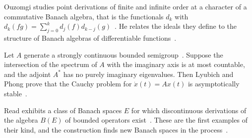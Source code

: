 Ouzomgi studies point derivations of finite and infinite order at a character
of a commutative Banach algebra, that is the functionals $d_k$ with
$d_k(fg)=\sum_{j=0}^{k}d_j(f)d_{k-j}(g)$~\cite{WlPointDerivationsAndIdealsInBan1989}. He relates the ideals they define
to the structure of Banach algebras of differentiable
functions~\cite{WlPointDerivationsAndIdealsInBan1989}.

Let $A$ generate a strongly continuous bounded
semigroup~\cite{WlAsymptoticStabilityOfLinearDif1988}. Suppose the intersection of the spectrum of $A$ with the imaginary
axis is
at most countable, and the adjoint $A^*$ has no purely imaginary eigenvalues.
Then Lyubich and Phong prove that the Cauchy problem for $\dot{x}(t)=Ax(t)$ is
asymptotically
stable~\cite{WlAsymptoticStabilityOfLinearDif1988}.

Read exhibits a class of Banach spaces $E$ for which discontinuous derivations
of the algebra $B(E)$ of bounded operators exist~\cite{WlDiscontinuousDerivationsOnTheA1989}. These are the first examples
of their
kind, and the construction finds new Banach spaces in the
process~\cite{WlDiscontinuousDerivationsOnTheA1989}.

